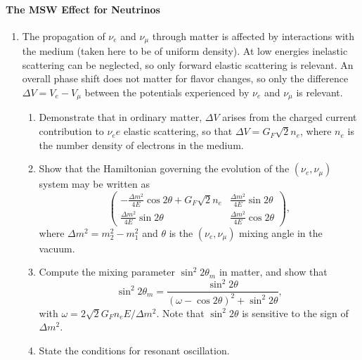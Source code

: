 \documentclass[letterpaper,11pt]{article}
\begin{document}
\paragraph*{The MSW Effect for Neutrinos}
\begin{enumerate}
  \item The propagation of $\nu_e$ and $\nu_\mu$ through matter is affected by interactions with the medium (taken here to be of uniform density). At low energies inelastic scattering can be neglected, so only forward elastic scattering is relevant. An overall phase shift does not matter for flavor changes, so only the difference $\Delta V = V_e - V_\mu$ between the potentials experienced by $\nu_e$ and $\nu_\mu$ is relevant.
  \begin{enumerate}
    \item Demonstrate that in ordinary matter, $\Delta V$ arises from the charged current contribution to $\nu_e e$ elastic scattering, so that $\Delta V = G_F \sqrt{2} n_e$, where $n_e$ is the number density of electrons in the medium.
    \item Show that the Hamiltonian governing the evolution of the $(\nu_e, \nu_\mu)$ system may be written as\
    \begin{equation}
      \left( \begin{array}{cc} -\frac{\Delta m^2}{4E} \cos 2\theta + G_F\sqrt{2} n_e & \frac{\Delta m^2}{4E} \sin 2\theta \\ \frac{\Delta m^2}{4E} \sin 2\theta & \frac{\Delta m^2}{4E} \cos 2\theta \end{array} \right),
    \end{equation}
    where $\Delta m^2 = m_2^2 - m_1^2$ and $\theta$ is the $(\nu_e, \nu_\mu)$ mixing angle in the vacuum.
    \item Compute the mixing parameter $\sin^2 2\theta_m$ in matter, and show that
    \begin{equation}
      \sin^2 2\theta_m = \frac{\sin^2 2\theta}{(\omega - \cos 2\theta)^2 + \sin^2 2\theta},
    \end{equation}
    with $\omega = 2 \sqrt{2} G_F n_e E/\Delta m^2$. Note that $\sin^2 2\theta$ is sensitive to the sign of $\Delta m^2$.
    \item State the conditions for resonant oscillation.
  \end{enumerate}
\end{enumerate}
\end{document}
